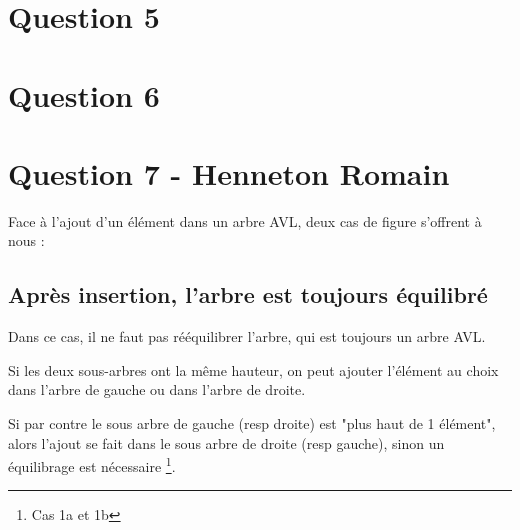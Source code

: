 \documentclass[10pt,a4paper]{article}
\begin{document}
\section*{Question 5}
\section*{Question 6}
\section*{Question 7 - Henneton Romain}
Face à l'ajout d'un élément dans un arbre AVL, deux cas de figure s'offrent à nous :
\subsection*{Après insertion, l'arbre est toujours équilibré}
Dans ce cas, il ne faut pas rééquilibrer l'arbre, qui est toujours un arbre AVL. 

Si les deux sous-arbres ont la même hauteur, on peut ajouter l'élément au choix dans l'arbre de gauche ou dans l'arbre de droite.

Si par contre le sous arbre de gauche (resp droite) est "plus haut de 1 élément", alors l'ajout se fait dans le sous arbre de droite (resp gauche), sinon un équilibrage est nécessaire \footnote{Cas 1a et 1b}.
\end{document}
